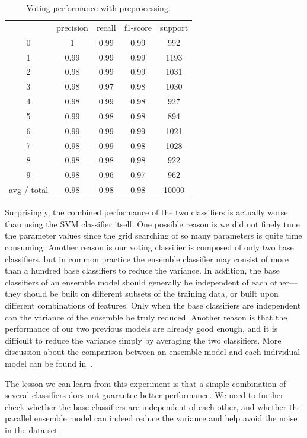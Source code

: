 \documentclass{article}
\begin{document}
\begin{table}[!htb]
	\centering
	\small 
	\caption{Voting performance with preprocessing.}
	\begin{tabular}{ccccc}
		& precision & recall & f1-score & support \\
		0     & 1     & 0.99  & 0.99  & 992 \\
		1     & 0.99  & 0.99  & 0.99  & 1193 \\
		2     & 0.98  & 0.99  & 0.99  & 1031 \\
		3     & 0.98  & 0.97  & 0.98  & 1030 \\
		4     & 0.98  & 0.99  & 0.98  & 927 \\
		5     & 0.99  & 0.98  & 0.98  & 894 \\
		6     & 0.99  & 0.99  & 0.99  & 1021 \\
		7     & 0.98  & 0.99  & 0.98  & 1028 \\
		8     & 0.98  & 0.98  & 0.98  & 922 \\
		9     & 0.98  & 0.96  & 0.97  & 962 \\
		avg / total & 0.98  & 0.98  & 0.98  & 10000 \\
	\end{tabular}%
	\label{tbl:voting}%
\end{table}%


Surprisingly, the combined performance of the two classifiers is actually worse than using the SVM classifier itself. One possible reason is we did not finely tune the parameter values since the grid searching of so many parameters is quite time consuming. Another reason is our voting classifier is composed of only two base classifiers, but in common practice the ensemble classifier may consist of more than a hundred base classifiers to reduce the variance. In addition, the base classifiers of an ensemble model should generally be independent of each other---they should be built on different subsets of the training data, or built upon different combinations of features. Only when the base classifiers are independent can the variance of the ensemble be truly reduced. Another reason is that the performance of our two previous models are already good enough, and it is difficult to reduce the variance simply by averaging the two classifiers. More discussion about the comparison between an ensemble model and each individual model can be found in~\cite{dvzeroski2004combining}. 

The lesson we can learn from this experiment is that a simple combination of several classifiers does not guarantee better performance. We need to further check whether the base classifiers are independent of each other, and whether the parallel ensemble model can indeed reduce the variance and help avoid the noise in the data set.









\end{document}
